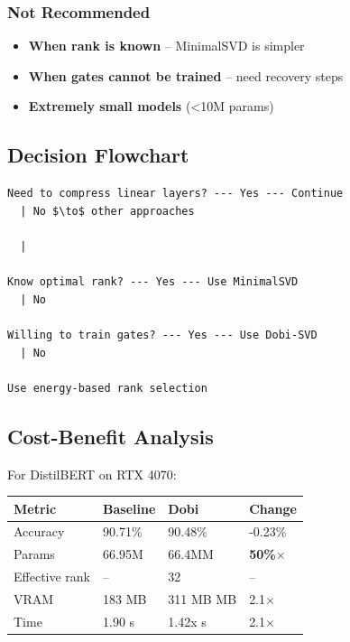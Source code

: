 \subsubsection{Not Recommended}

\begin{itemize}
\item \textbf{When rank is known} -- MinimalSVD is simpler
\item \textbf{When gates cannot be trained} -- need recovery steps
\item \textbf{Extremely small models} (\textless{}10M params)

\end{itemize}
\subsection{Decision Flowchart}

\begin{lstlisting}
Need to compress linear layers? --- Yes --- Continue
  | No $\to$ other approaches

  |
   
Know optimal rank? --- Yes --- Use MinimalSVD
  | No
   
Willing to train gates? --- Yes --- Use Dobi-SVD
  | No
   
Use energy-based rank selection
\end{lstlisting}

\subsection{Cost-Benefit Analysis}

For DistilBERT on RTX 4070:

\begin{table}[H]
\centering
\small
\begin{tabular}{llll}
\toprule
\textbf{Metric} & \textbf{Baseline} & \textbf{Dobi} & \textbf{Change} \\
\midrule
Accuracy & 90.71\% & 90.48\% & -0.23\% \\
Params & 66.95M & 66.4MM & \textbf{50\%$\times$} \\
Effective rank & -- & 32 & -- \\
VRAM & 183 MB & 311 MB MB & 2.1$\times$ \\
Time & 1.90 s & 1.42x s & 2.1$\times$ \\
\bottomrule
\end{tabular}
\end{table}

